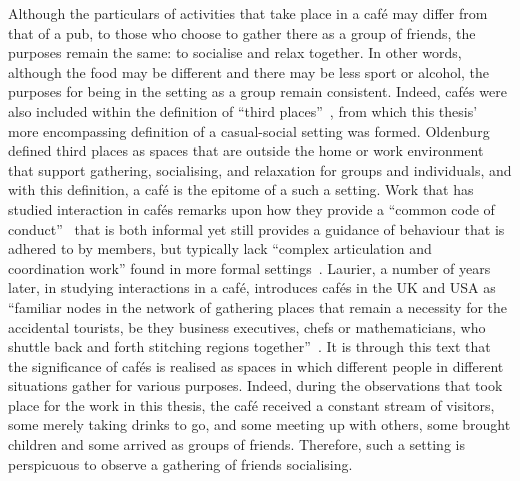 \begin{revisedsubmission}
Although the particulars of activities that take place in a caf\'{e} may differ from that of a pub, to those who choose to gather there as a group of friends, the purposes remain the same: to socialise and relax together.
In other words, although the food may be different and there may be less sport or alcohol, the purposes for being in the setting as a group remain consistent.
Indeed, caf\'{e}s were also included within the definition of ``third places''~\citep{Oldenburg1989}, from which this thesis' more encompassing definition of a casual-social setting was formed.
Oldenburg defined third places as spaces that are outside the home or work environment that support gathering, socialising, and relaxation for groups and individuals, and with this definition, a caf\'{e} is the epitome of a such a setting.
Work that has studied interaction in caf\'{e}s remarks upon how they provide a ``common code of conduct''~\citep[p. 210]{Laurier2001}  that is both informal yet still provides a guidance of behaviour that is adhered to by members, but typically lack ``complex articulation and coordination work'' found in more formal settings~\citep[p. 222]{Laurier2001}.
Laurier, a number of years later, in studying interactions in a caf\'{e}, introduces caf\'{e}s in the UK and USA as ``familiar nodes in the network of gathering places that remain a necessity for the accidental tourists, be they business executives, chefs or mathematicians, who shuttle back and forth stitching regions together''~\citep[p. 5]{Laurier2008a}.
It is through this text that the significance of caf\'{e}s is realised as spaces in which different people in different situations gather for various purposes.
Indeed, during the observations that took place for the work in this thesis, the caf\'{e} received a constant stream of visitors, some merely taking drinks to go, and some meeting up with others, some brought children and some arrived as groups of friends.
Therefore, such a setting is perspicuous to observe a gathering of friends socialising.
\end{revisedsubmission}






